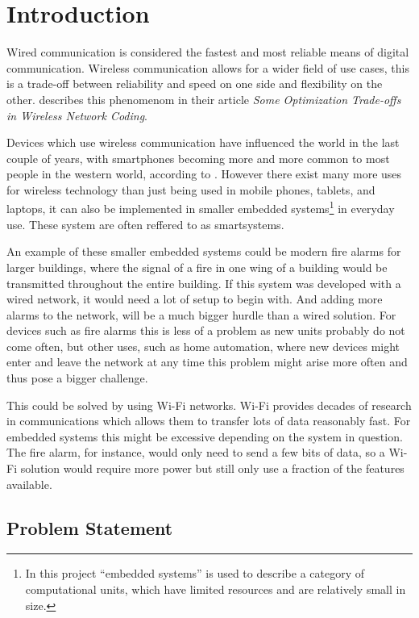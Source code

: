 \chapter{Introduction}
\vspace{-20pt}
Wired communication is considered the fastest and most reliable means of digital communication.
Wireless communication allows for a wider field of use cases, this is a trade-off between reliability and speed on one side and flexibility on the other. 
\citet{wirelessTradeoffs} describes this phenomenom in their article \emph{Some Optimization Trade-offs in Wireless Network Coding}.

Devices which use wireless communication have influenced the world in the last couple of years, with smartphones becoming more and more common to most people in the western world, according to \citet{2013-SmartPhoneUse}.
However there exist many more uses for wireless technology than just being used in mobile phones, tablets, and laptops, it can also be implemented in smaller embedded systems\footnote{In this project \enquote{embedded systems} is used to describe a category of computational units, which have limited resources and are relatively small in size. } in everyday use.
These system are often reffered to as smartsystems.

An example of these smaller embedded systems could be modern fire alarms for larger buildings, where the signal of a fire in one wing of a building would be transmitted throughout the entire building.
If this system was developed with a wired network, it would need a lot of setup to begin with.
And adding more alarms to the network, will be a much bigger hurdle than a wired solution. 
For devices such as fire alarms this is less of a problem as new units probably do not come often, but other uses, such as home automation, where new devices might enter and leave the network at any time this problem might arise more often and thus pose a bigger challenge.

This could be solved by using Wi-Fi networks.
Wi-Fi provides decades of research in communications which allows them to transfer lots of data reasonably fast.
For embedded systems this might be excessive depending on the system in question.
The fire alarm, for instance, would only need to send a few bits of data, so a Wi-Fi solution would require more power but still only use a fraction of the features available.

\section{Problem Statement}\label{sec:problemStatement}

